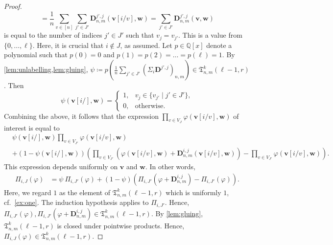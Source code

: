 \documentclass[11pt, DIV=15]{scrarticle}
\theoremstyle{definition}
\theoremstyle{plain}
\theoremstyle{remark}
\renewcommand{\phi}{\varphi}
\begin{document}
\begin{proof}
\[			= \frac1n \sum_{v \in [n]} \sum_{j' \in J'}\boldsymbol{D}^{j', j}_{n,m}(\boldsymbol{v}[i/v], \boldsymbol{w})
			= \sum_{j' \in J'} \boldsymbol{D}^{j', j}_{n,m}(\boldsymbol{v}, \boldsymbol{w})
		\]
		is equal to the number of indices $j' \in J'$ such that $v_j = v_{j'}$.
		This is a value from $\{0, \dots, \ell\}$.
		Here, it is crucial that $i \not\in J$, as assumed.
		Let $p \in \mathbb{Q}[x]$ denote a polynomial such that $p(0) = 0$ and $p(1) = p(2) = \dots = p(\ell) = 1$.
		By \cref{lem:unlabelling,lem:gluing},
		$\psi \coloneqq p(\frac1n \sum_{j' \in J'} (\Sigma_i\boldsymbol{D}^{j', j})_{n,m}) \in \mathfrak{T}_{n,m}^k(\ell-1, r)$.
		Then
		\begin{equation*}
			\psi(\boldsymbol{v}[i/], \boldsymbol{w}) = \begin{cases}
				1, & v_j \in \{v_{j'} \mid j' \in J'\}, \\
				0, & \text{otherwise}.
			\end{cases}
		\end{equation*}
		Combining the above,
		it follows that the expression $\prod_{v \in V_{J}}
		\phi(\boldsymbol{v}[i/v], \boldsymbol{w})$ of interest is equal to
		\begin{align*}
			&\psi(\boldsymbol{v}[i/], \boldsymbol{w})
			\prod_{v \in V_{J'}} \phi(\boldsymbol{v}[i/v], \boldsymbol{w}) \\
			&+
			(1-\psi(\boldsymbol{v}[i/], \boldsymbol{w}))
			\left(\prod_{v \in V_{J'}}
			\left( \phi(\boldsymbol{v}[i/v], \boldsymbol{w}) + \boldsymbol{D}^{i, j}_{n, m}(\boldsymbol{v}[i/v], \boldsymbol{w}) \right) 
			- \prod_{v \in V_{J'}}  \phi(\boldsymbol{v}[i/v], \boldsymbol{w}) \right).
		\end{align*}
		This expression depends uniformly on $\boldsymbol{v}$ and $\boldsymbol{w}$.
		In other words,
		\begin{align*}
			\Pi_{i, J} (\phi) &= \psi \ \Pi_{i, J'}( \phi) + (1- \psi) \left( \Pi_{i,J'}(\phi + \boldsymbol{D}^{i,j}_{n,m}) - \Pi_{i, J'} (\phi) \right).
		\end{align*}
		Here, we regard $1$ as the element of $\mathfrak{T}^k_{n,m}(\ell-1, r)$ which is uniformly $1$, cf.\ \cref{ex:one}.
		The induction hypothesis applies to $\Pi_{i, J'}$.
		Hence, $\Pi_{i, J'}( \phi),\Pi_{i,J'}(\phi + \boldsymbol{D}^{i,j}_{n,m}) \in \mathfrak{T}^{k}_{n,m}(\ell-1,r)$.
		By \cref{lem:gluing}, $\mathfrak{T}^k_{n,m}(\ell-1, r)$ is closed under pointwise products.
		Hence, $\Pi_{i, J} (\phi) \in \mathfrak{T}^k_{n,m}(\ell-1, r)$.
	\end{proof}
\end{document}

